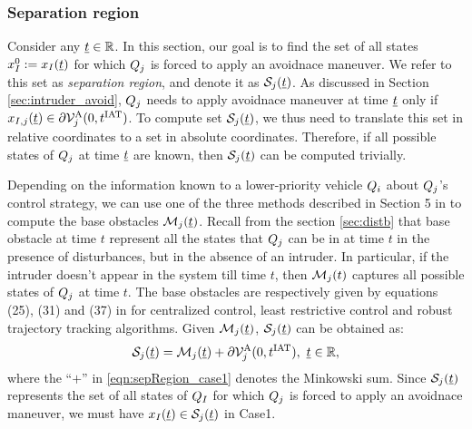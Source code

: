 \subsubsection{Separation region} \label{sec:sepRegion_case1}
Consider any $\underline{t} \in \mathbb{R}$. In this section, our goal is to find the set of all states $x_{I}^0 := x_{I}(\underline{t})$ for which $Q_j$ is forced to apply an avoidnace maneuver. We refer to this set as \textit{separation region}, and denote it as $\mathcal{S}_j(\underline{t})$. As discussed in Section \ref{sec:intruder_avoid}, $Q_j$ needs to apply avoidnace maneuver at time $\underline{t}$ only if $x_{I, j}(\underline{t}) \in \partial \mathcal{V}^{\text{A}}_{j}(0, t^\text{IAT})$. To compute set $\mathcal{S}_j(\underline{t})$, we thus need to translate this set in relative coordinates to a set in absolute coordinates. Therefore, if all possible states of $Q_j$ at time $\underline{t}$ are known, then $\mathcal{S}_j(\underline{t})$ can be computed trivially.

Depending on the information known to a lower-priority vehicle $Q_i$ about $Q_j$'s control strategy, we can use one of the three methods described in Section 5 in \cite{chen2016robust} to compute the base obstacles $\mathcal{M}_j(\underline{t})$. Recall from the section \ref{sec:distb} that base obstacle at time $t$ represent all the states that $Q_j$ can be in at time $t$ in the presence of disturbances, but in the absence of an intruder. In particular, if the intruder doesn't appear in the system till time $t$, then  $\mathcal{M}_j(t)$ captures all possible states of $Q_j$ at time $t$. The base obstacles are respectively given by equations (25), (31) and (37) in \cite{chen2016robust} for centralized control, least restrictive control and robust trajectory tracking algorithms. Given $\mathcal{M}_j(\underline{t})$, $\mathcal{S}_j(\underline{t})$ can be obtained as:
\begin{equation} \label{eqn:sepRegion_case1}
\sep_j(\tsa) = \boset_j(\tsa) + \partial \brs^{\text{A}}_{j}(0, \iat), ~\tsa \in \R,
\end{equation}
where the ``$+$'' in \eqref{eqn:sepRegion_case1} denotes the Minkowski sum. Since $\mathcal{S}_j(\underline{t})$ represents the set of all states of $Q_I$ for which $Q_j$ is forced to apply an avoidnace maneuver, we must have $x_{I}(\underline{t}) \in \mathcal{S}_j(\underline{t})$ in Case1.
